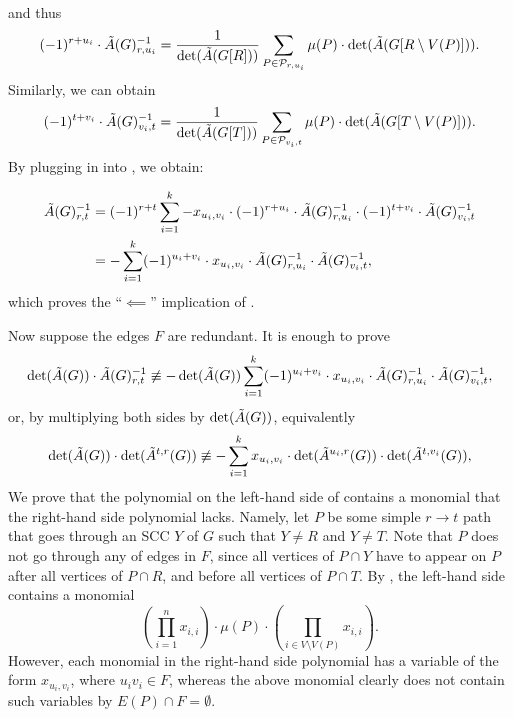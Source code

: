 \documentclass[11pt]{article}
\begin{document}
{\begin{align*}
\end{align*}
and thus
\begin{equation}\label{eq:u1ui}
  (-1)^{r+u_i}\cdot \tilde{A}(G)^{-1}_{r,u_i}=\frac{1}{\det(\tilde{A}(G[R]))}\sum_{P\in \mathcal{P}_{r,u_i}} \mu(P)\cdot \det(\tilde{A}(G[R\setminus V(P)])).
\end{equation}
Similarly, we can obtain
\begin{equation}\label{eq:viv1}
  (-1)^{t+v_i}\cdot \tilde{A}(G)^{-1}_{v_i,t}=\frac{1}{\det(\tilde{A}(G[T]))}\sum_{P\in \mathcal{P}_{v_i,t}} \mu(P)\cdot \det(\tilde{A}(G[T\setminus V(P)])).
\end{equation}
By plugging in  into , we obtain:

\begin{align*}
  \tilde{A}(G)^{-1}_{r,t}&=(-1)^{r+t}\sum_{i=1}^k -x_{u_i,v_i}\cdot (-1)^{r+u_i}\cdot \tilde{A}(G)^{-1}_{r,u_i} \cdot (-1)^{t+v_i}\cdot \tilde{A}(G)^{-1}_{v_i,t}\\
  &=-\sum_{i=1}^k (-1)^{u_i+v_i}\cdot x_{u_i,v_i}\cdot \tilde{A}(G)^{-1}_{r,u_i}\cdot \tilde{A}(G)^{-1}_{v_i,t},
\end{align*}
which proves the ``$\impliedby$'' implication of .

Now suppose the edges $F$ are redundant. It is enough to prove
\begin{align*}
  \det(\tilde{A}(G))\cdot \tilde{A}(G)^{-1}_{r,t}\not\equiv-\det(\tilde{A}(G))\sum_{i=1}^k (-1)^{u_i+v_i}\cdot x_{u_i,v_i}\cdot \tilde{A}(G)^{-1}_{r,u_i}\cdot \tilde{A}(G)^{-1}_{v_i,t},
\end{align*}
or, by multiplying both sides by $\det(\tilde{A}(G))$, equivalently
\begin{align}\label{eq:cond}
  \det(\tilde{A}(G))\cdot \det(\tilde{A}^{t,r}(G))\not\equiv-\sum_{i=1}^k x_{u_i,v_i}\cdot \det(\tilde{A}^{u_i,r}(G))\cdot \det(\tilde{A}^{t,v_i}(G)),
\end{align}
We prove that the polynomial on the left-hand side of 
contains a monomial
that the right-hand side polynomial lacks.
Namely, let $P$ be some simple $r\to t$ path that goes through an SCC $Y$ of $G$
such that $Y\neq R$ and $Y\neq T$. 
Note that $P$ does not go through any of edges in $F$, since all vertices
of $P\cap Y$ have to appear on $P$ after all vertices of $P\cap R$, and before all vertices
of $P\cap T$.
By ,
the left-hand side contains a monomial
$$\left(\prod_{i=1}^n x_{i,i}\right)\cdot \mu(P) \cdot \left(\prod_{i\in V\setminus V(P)} x_{i,i}\right).$$
However, each monomial in the right-hand side polynomial has a variable
of the form $x_{u_i,v_i}$, where $u_iv_i\in F$, whereas the above
monomial clearly does not contain such variables by $E(P)\cap F=\emptyset$.


 }
\end{document}
